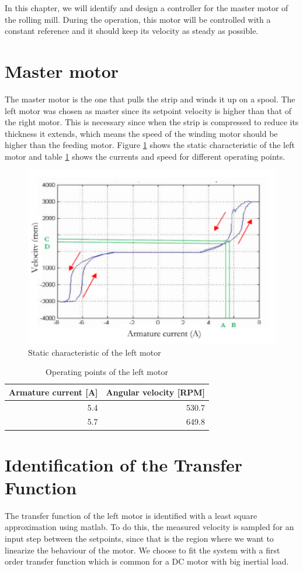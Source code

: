 In this chapter, we will identify and design a controller for the master motor of the rolling mill. During the operation, this motor will be controlled with a constant reference and it should keep its velocity as steady as possible.

\section{Master motor}
The master motor is the one that pulls the strip and winds it up on a spool. The left motor was chosen as master since its setpoint velocity is higher than that of the right motor. This is necessary since when the strip is compressed to reduce its thickness it extends, which means the speed of the winding motor should be higher than the feeding motor. Figure \ref{fig:LM_RPM_curr} shows the static characteristic of the left motor and table \ref{tab:LM_operating_region} shows the currents and speed for different operating points.

\begin{figure}[htbp]
\centering
\includegraphics[width = .6\textwidth]{pics/LM_RPM_Current.png}
\caption{Static characteristic of the left motor\label{fig:LM_RPM_curr}}
\end{figure}

\begin{table}[htbp]
	\centering
	\begin{tabular}{rr}
    \toprule
		Armature current [A] & Angular velocity [RPM] \\ \midrule
    5.4 & 530.7 \\
    5.7 & 649.8 \\\bottomrule
	\end{tabular}
	\caption{Operating points of the left motor\label{tab:LM_operating_region}}
\end{table}

\section{Identification of the Transfer Function}
The transfer function of the left motor is identified with a least square approximation using matlab. To do this, the measured velocity is sampled for an input step between the setpoints, since that is the region where we want to linearize the behaviour of the motor. We choose to fit the system with a first order transfer function which is common for a DC motor with big inertial load.

